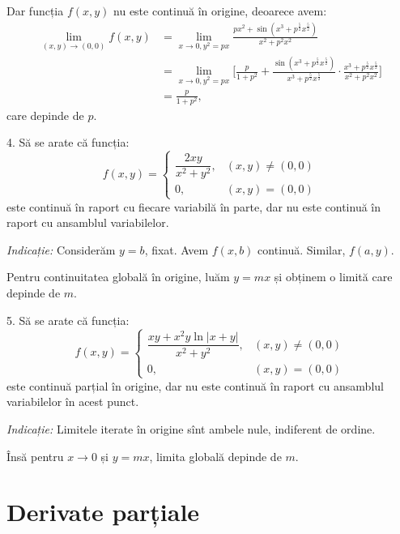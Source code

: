 Dar funcția $f(x, y)$ nu este continuă în origine, deoarece avem:
\begin{align*}
  \lim_{(x, y) \to (0, 0)} f(x, y) &= \lim_{x \to 0, y^2 = px} \frac{px^2 + \sin(x^3 + p^\frac{5}{2} x^{\frac{5}{2}})}{x^2 + p^2 x^2} \\
                                   &= \lim_{x \to 0, y^2 = px} \Bigg[ \frac{p}{1 + p^2} + %
                                     \frac{\sin(x^3 + p^{\frac{5}{2}} x^{\frac{5}{2}})}{x^3 + p^{\frac{5}{2}} x^{\frac{5}{2}}} \cdot %
                                     \frac{x^3 + p^{\frac{5}{2}} x^{\frac{5}{2}}}{x^2 + p^2 x^2} \Bigg] \\
                                   &= \frac{p}{1 + p^2},
\end{align*}
care depinde de $p$.

\vspace{0.5cm}

4. Să se arate că funcția:
\[
  f(x, y) = \begin{cases}
    \dfrac{2xy}{x^2 + y^2}, & (x, y) \neq (0, 0) \\
    0, & (x, y) = (0, 0)
  \end{cases}
\]
este continuă în raport cu fiecare variabilă în parte, dar nu este continuă în raport
cu ansamblul variabilelor.

\emph{Indicație:} Considerăm $y = b$, fixat. Avem $f(x, b)$ continuă. Similar, $f(a, y)$.

Pentru continuitatea globală în origine, luăm $y = mx$ și obținem o limită care depinde de $m$.

\vspace{0.5cm}

5. Să se arate că funcția:
\[
  f(x, y) = \begin{cases}
    \dfrac{xy + x^2 y \ln |x + y|}{x^2 + y^2}, & (x, y) \neq (0, 0) \\
    0, & (x, y) = (0, 0)
  \end{cases}
\]
este continuă parțial în origine, dar nu este continuă în raport cu ansamblul
variabilelor în acest punct.

\emph{Indicație:} Limitele iterate în origine sînt ambele nule, indiferent de ordine.

Însă pentru $x \to 0$ și $y = mx$, limita globală depinde de $m$.


\section{Derivate parțiale}

